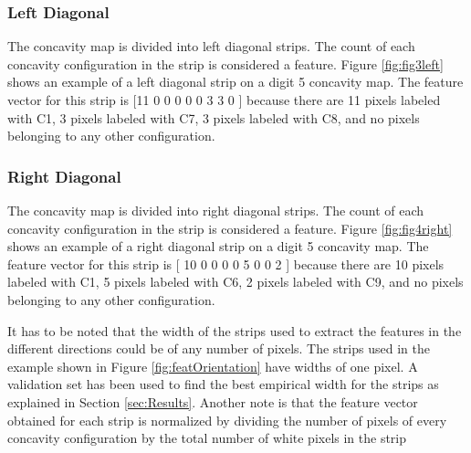 \documentclass[conference]{IEEEtran}
\begin{document}
\subsubsection{Left Diagonal}

The concavity map is divided into left diagonal strips. The count of each concavity configuration in the strip is considered a feature. Figure \ref{fig:fig3left} shows an example of a left diagonal strip on a digit 5 concavity map. The feature vector for this strip is [11 0 0 0 0 0 3 3 0 ] because there are 11 pixels labeled with C1, 3 pixels labeled with C7, 3 pixels labeled with C8, and no pixels belonging to any other configuration.
\subsubsection{Right Diagonal}
 The concavity map is divided into right diagonal strips. The count of each concavity configuration in the strip is considered a feature. Figure  \ref{fig:fig4right} shows an example of a right diagonal strip on a digit 5 concavity map. The feature vector for this strip is [ 10 0 0 0 0 5 0 0 2 ] because there are 10 pixels labeled with C1, 5 pixels labeled with C6, 2 pixels labeled with C9, and no pixels belonging to any other configuration.



It has to be noted that the width of the strips used to extract the features in the different directions could be of any number of pixels. The strips used in the example shown in Figure \ref{fig:featOrientation} have widths of one pixel. A validation set has been used to find the best empirical width for the strips as explained in Section \ref{sec:Results}. Another note is that the feature vector obtained for each strip is normalized by dividing the number of pixels of every concavity configuration by the total number of white pixels in the strip
\end{document}
